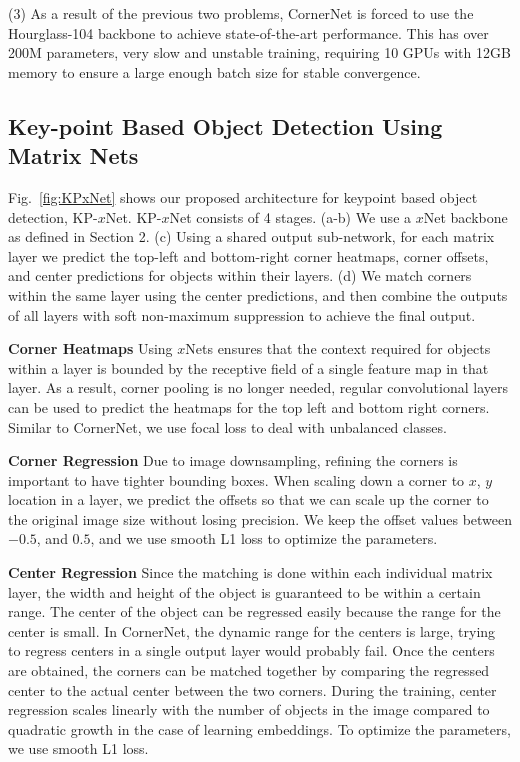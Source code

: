 \documentclass[10pt,twocolumn,letterpaper]{article}
\begin{document}
(3) As a result of the previous two problems, CornerNet is forced to use the Hourglass-104 backbone to achieve state-of-the-art performance. This has over 200M parameters, very slow and unstable training, requiring 10 GPUs with 12GB memory to ensure a large enough batch size for stable convergence.

\subsection{Key-point Based Object Detection Using Matrix Nets}
\vspace{-0.25cm}
Fig.~\ref{fig:KPxNet} shows our proposed architecture for keypoint based object detection, KP-$x$Net. KP-$x$Net consists of 4 stages. (a-b) We use a $x$Net backbone as defined in Section 2. (c) Using a shared output sub-network, for each matrix layer we predict the top-left and bottom-right corner heatmaps, corner offsets, and center predictions for objects within their layers. (d) We match corners within the same layer using the center predictions, and then combine the outputs of all layers with soft non-maximum suppression to achieve the final output.

\textbf{Corner Heatmaps}
Using $x$Nets ensures that the context required for objects within a layer is bounded by the receptive field of a single feature map in that layer. As a result, corner pooling is no longer needed, regular convolutional layers can be used to predict the heatmaps for the top left and bottom right corners. Similar to CornerNet, we use focal loss to deal with unbalanced classes.

\textbf{Corner Regression}
Due to image downsampling, refining the corners is important to have tighter bounding boxes. When scaling down a corner to $x$, $y$ location in a layer, we predict the offsets so that we can scale up the corner to the original image size without losing precision. We keep the offset values between $-0.5$, and $0.5$, and we use smooth L1 loss to optimize the parameters.

\textbf{Center Regression}
Since the matching is done within each individual matrix layer,  the width and height of the object is guaranteed to be within a certain range. The center of the object can be regressed easily because the range for the center is small. In CornerNet, the dynamic range for the centers is large, trying to regress centers in a single output layer would probably fail. Once the centers are obtained, the corners can be matched together by comparing the regressed center to the actual center between the two corners. During the training, center regression scales linearly with the number of objects in the image compared to quadratic growth in the case of learning embeddings. To optimize the parameters, we use smooth L1 loss.
\end{document}
